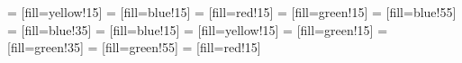 \documentclass[9pt]{scrartcl}
\begin{document}

	\newcommand{\NaturalElementTextFormat}[7]
	{
    \begin{minipage}{22mm}%
    \centering%
    \par\noindent\parbox[t]{.333\textwidth}{\raggedright\textsf{#1}}%
    \parbox[t]{.333\textwidth}{\centering\textsf{#7}}%
    \parbox[t]{.333\textwidth}{\raggedleft \textsf{#2\textit{#3}}}\par%
    \vspace*{0.5em}%
    {\Huge\textbf{#5}}\\%
    \vspace*{0.14em}%
    \large{#6}\\%
    \footnotesize{#4}
    \end{minipage}
	}
	
	 = [fill=yellow!15]
	 = [fill=blue!15]
	 = [fill=red!15]
	 = [fill=green!15]
   = [fill=blue!55]
   = [fill=blue!35]
   = [fill=blue!15]
   = [fill=yellow!15]
   = [fill=green!15]
   = [fill=green!35]
   = [fill=green!55]
   = [fill=red!15]

  \title{\vspace{-0.5cm}\doctitle}
  \subtitle{\docsubtitle}
  \date{}
	\maketitle
\end{document}
